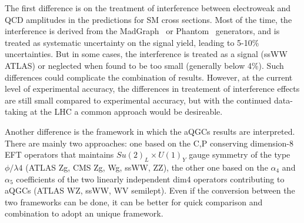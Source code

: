 

The first difference is on the treatment of interference between electroweak and QCD amplitudes in the predictions for SM cross sections. Most of the time, the interference is derived from the MadGraph~\cite{Alwall:2007fs} or Phantom~\cite{Ballestrero:2007xq} generators, and is treated as systematic uncertainty on the signal yield, leading to 5-10\% uncertainties. But in some cases, the interference is treated as a signal (ssWW ATLAS) or neglected when found to be too small (generally below 4\%). Such differences could complicate the combination of results.
However, at the current level of experimental accuracy, the differences in treatement of interference effects are still small compared to experimental accuracy, but with the continued data-taking at the LHC a common approach would be desireable.

Another difference is the framework in which the aQGCs results are interpreted. There are mainly two approaches: one based on the C,P conserving dimension-8 EFT operators that maintains $Su(2)_L \times U(1)_Y$ gauge symmetry of the type $\phi/\lambda{}4$ (ATLAS Zg, CMS Zg, Wg, ssWW, ZZ), the other one based on the $\alpha_4$ and $\alpha_5$ coefficients of the two linearly independent dim4 operators contributing to aQGCs (ATLAS WZ, ssWW, WV semilept). Even if the conversion between the two frameworks can be done, it can be better for quick comparison and combination to adopt an unique framework.

